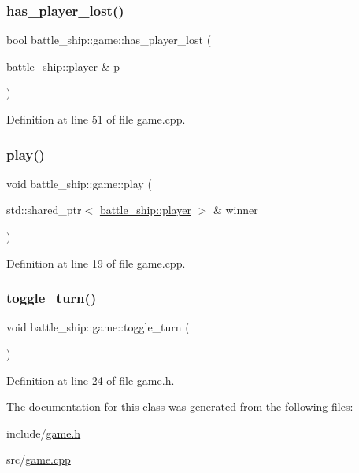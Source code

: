 \subsubsection{\texorpdfstring{has\+\_\+player\+\_\+lost()}{has\_player\_lost()}}
{\footnotesize\ttfamily bool battle\+\_\+ship\+::game\+::has\+\_\+player\+\_\+lost (\begin{DoxyParamCaption}\item[{\hyperlink{classbattle__ship_1_1player}{battle\+\_\+ship\+::player} \&}]{p }\end{DoxyParamCaption})}



Definition at line 51 of file game.\+cpp.

\mbox{\label{classbattle__ship_1_1game_a2cfee3f6969a0b01243e65870058fb07}} 
\subsubsection{\texorpdfstring{play()}{play()}}
{\footnotesize\ttfamily void battle\+\_\+ship\+::game\+::play (\begin{DoxyParamCaption}\item[{std\+::shared\+\_\+ptr$<$ \hyperlink{classbattle__ship_1_1player}{battle\+\_\+ship\+::player} $>$ \&}]{winner }\end{DoxyParamCaption})}



Definition at line 19 of file game.\+cpp.

\mbox{\label{classbattle__ship_1_1game_a0e5a85f6c1f0cff5e1104545b5222026}} 
\subsubsection{\texorpdfstring{toggle\+\_\+turn()}{toggle\_turn()}}
{\footnotesize\ttfamily void battle\+\_\+ship\+::game\+::toggle\+\_\+turn (\begin{DoxyParamCaption}{ }\end{DoxyParamCaption})\hspace{0.3cm}{\ttfamily [inline]}}



Definition at line 24 of file game.\+h.



The documentation for this class was generated from the following files\+:\begin{DoxyCompactItemize}
\item 
include/\hyperlink{game_8h}{game.\+h}\item 
src/\hyperlink{game_8cpp}{game.\+cpp}\end{DoxyCompactItemize}

